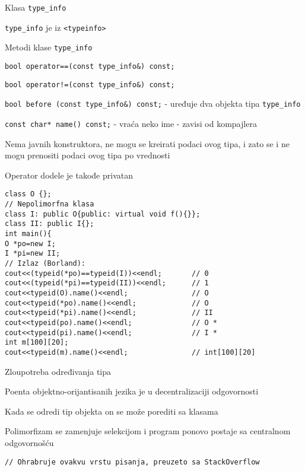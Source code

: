 \documentclass{article}
\newenvironment{xitemize}{%
    
    \itemize
    \larger
}{%
    \enditemize
}
\let\olditemize\itemize
\let\endolditemize\enditemize
\renewenvironment{itemize}{%
    \smaller
    \olditemize
}{%
    \endolditemize
}
\providecommand{\inlinecode}[1]{\texttt{#1}}
\begin{document}
\begin{xitemize}
\begin{itemize}
\end{itemize}
\item Klasa \inlinecode{type\_info}
\begin{itemize}
    \item \inlinecode{type\_info} je iz \inlinecode{<typeinfo>}
    \item Metodi klase \inlinecode{type\_info}
    \begin{itemize}
        \item \inlinecode{bool operator==(const type\_info\&) const;}
        \item \inlinecode{bool operator!=(const type\_info\&) const;}
        \item \inlinecode{bool before (const type\_info\&) const;} - uređuje dva objekta tipa \inlinecode{type\_info}
        \item \inlinecode{const char* name() const;} - vraća neko ime - zavisi od kompajlera
    \end{itemize}
    \item Nema javnih konstruktora, ne mogu se kreirati podaci ovog tipa, i zato se i ne mogu prenositi podaci ovog tipa po vrednosti
    \item Operator dodele je takođe privatan
    \begin{lstlisting}
class O {};
// Nepolimorfna klasa
class I: public O{public: virtual void f(){}};
class II: public I{};
int main(){
O *po=new I;
I *pi=new II;
// Izlaz (Borland):
cout<<(typeid(*po)==typeid(I))<<endl;       // 0
cout<<(typeid(*pi)==typeid(II))<<endl;      // 1
cout<<typeid(O).name()<<endl;               // O
cout<<typeid(*po).name()<<endl;             // O
cout<<typeid(*pi).name()<<endl;             // II
cout<<typeid(po).name()<<endl;              // O *
cout<<typeid(pi).name()<<endl;              // I *
int m[100][20];
cout<<typeid(m).name()<<endl;               // int[100][20]
    \end{lstlisting}
\end{itemize}
\item Zloupotreba određivanja tipa
\begin{itemize}
    \item Poenta objektno-orijantisanih jezika je u decentralizaciji odgovornosti
    \item Kada se odredi tip objekta on se može porediti sa klasama
    \item Polimorfizam se zamenjuje selekcijom i program ponovo postaje sa centralnom odgovornošću
    \begin{lstlisting}
// Ohrabruje ovakvu vrstu pisanja, preuzeto sa StackOverflow

\end{lstlisting}
\end{itemize}
\end{xitemize}
\end{document}
